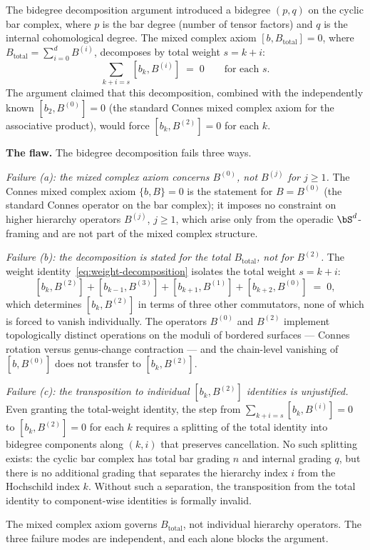 \begin{remark}
\label{rem:bidegree-argument-fails}
The bidegree decomposition argument introduced a bidegree $(p, q)$ on
the cyclic bar complex, where
$p$ is the bar degree (number of tensor factors) and $q$ is the
internal cohomological degree. The mixed complex axiom
$[b, B_{\mathrm{total}}] = 0$, where
$B_{\mathrm{total}} = \sum_{i=0}^{d} B^{(i)}$, decomposes by
total weight $s = k + i$:
\begin{equation}
\label{eq:weight-decomposition}
 \sum_{k + i = s} [b_k, B^{(i)}] \;=\; 0
 \qquad \text{for each } s.
\end{equation}
The argument claimed that this decomposition, combined with the
independently known $[b_2, B^{(0)}] = 0$ (the standard Connes
mixed complex axiom for the associative product), would force
$[b_k, B^{(2)}] = 0$ for each $k$.

\textbf{The flaw.} The bidegree decomposition fails three ways.

\emph{Failure (a): the mixed complex axiom concerns $B^{(0)}$, not
$B^{(j)}$ for $j \geq 1$.} The Connes mixed complex axiom
$\{b, B\} = 0$ is the statement for $B = B^{(0)}$ (the standard Connes
operator on the bar complex); it imposes no constraint on higher
hierarchy operators $B^{(j)}$, $j \geq 1$, which arise only from the
operadic $\bS^d$-framing and are not part of the mixed complex structure.

\emph{Failure (b): the decomposition is stated for the total
$B_{\mathrm{total}}$, not for $B^{(2)}$.} The weight
identity~\eqref{eq:weight-decomposition} isolates the total weight $s = k + i$:
\[
 [b_k, B^{(2)}] + [b_{k-1}, B^{(3)}]
 + [b_{k+1}, B^{(1)}] + [b_{k+2}, B^{(0)}] \;=\; 0,
\]
which determines $[b_k, B^{(2)}]$ in terms of three other commutators,
none of which is forced to vanish individually. The operators $B^{(0)}$
and $B^{(2)}$ implement topologically distinct operations on the moduli
of bordered surfaces — Connes rotation versus genus-change contraction
— and the chain-level vanishing of $[b, B^{(0)}]$ does not transfer to
$[b_k, B^{(2)}]$.

\emph{Failure (c): the transposition to individual $[b_k, B^{(2)}]$
identities is unjustified.} Even granting the total-weight
identity, the step from $\sum_{k+i = s} [b_k, B^{(i)}] = 0$ to
$[b_k, B^{(2)}] = 0$ for each $k$ requires a splitting of the total
identity into bidegree components along $(k, i)$ that preserves
cancellation. No such splitting exists: the cyclic bar complex has
total bar grading $n$ and internal grading $q$, but there is no
additional grading that separates the hierarchy index $i$ from the
Hochschild index $k$. Without such a separation, the transposition
from the total identity to component-wise identities is formally
invalid.

The mixed complex axiom governs $B_{\mathrm{total}}$, not individual
hierarchy operators. The three failure modes are independent, and each
alone blocks the argument.
\end{remark}



